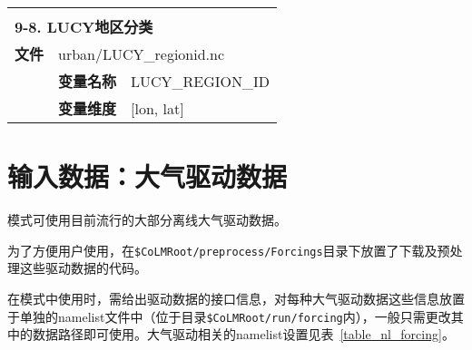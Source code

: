{\begin{longtable}{llp{}}
\midrule
\vspace{2\baselineskip}\\
\multicolumn{3}{l}{\textbf{9-8. LUCY地区分类}} \\
\cline{1-3}
\textbf{文件} & \multicolumn{2}{l}{urban/LUCY\_regionid.nc} \\
\cline{2-3}
& \textbf{变量名称} & LUCY\_REGION\_ID \\
& \textbf{变量维度} & {[}lon, lat{]} \\

\end{longtable}}

\section{输入数据：大气驱动数据}

模式可使用目前流行的大部分离线大气驱动数据。\par
为了方便用户使用，在\texttt{\$CoLMRoot/preprocess/Forcings}目录下放置了下载及预处理这些驱动数据的代码。\par
在模式中使用时，需给出驱动数据的接口信息，对每种大气驱动数据这些信息放置于单独的namelist文件中（位于目录\texttt{\$CoLMRoot/run/forcing}内），一般只需更改其中的数据路径即可使用。大气驱动相关的namelist设置见表~\ref{table_nl_forcing}。

